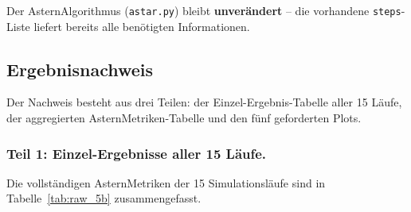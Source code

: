 Der \acs{Astern}Algorithmus (\texttt{astar.py}) bleibt \textbf{unverändert} -- die vorhandene \texttt{steps}-Liste liefert bereits alle benötigten Informationen.


\subsection{Ergebnisnachweis}
\label{sssec:astar_5b_nachweis}

Der Nachweis besteht aus drei Teilen: der Einzel-Ergebnis-Tabelle aller 15 Läufe, der aggregierten \acs{Astern}Metriken-Tabelle und den fünf geforderten Plots.

\subsubsection{Teil 1: Einzel-Ergebnisse aller 15 Läufe.}
Die vollständigen \acs{Astern}Metriken der 15 Simulationsläufe sind in Tabelle~\ref{tab:raw_5b} zusammengefasst.

